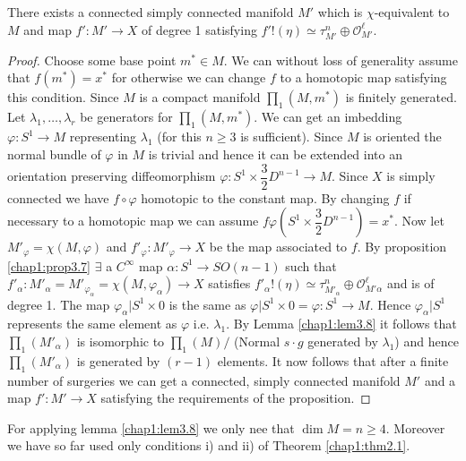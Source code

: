 \setcounter{prop}{8}
 \begin{prop}\label{chap1:prop3.9}%
There exists a connected simply connected manifold $M'$ which is
$\chi$-equivalent to $M$ and map $f':M'\rightarrow X$ of degree
1 satisfying $f'! (\eta) \simeq \tau^n_{M'}\oplus \mathscr{O}^\ell_{M'}$.  
 \end{prop} 
 
 \begin{proof}
Choose some base point $m^* \in M$. We can without loss of
generality assume that $f(m^*) = x^*$ for otherwise we can change $f$
to a homotopic map satisfying this condition. Since $M$ is a compact
manifold $\prod_1 (M, m^*)$ is finitely generated. Let $\lambda_1,
\ldots, \lambda_r$ be generators for $\prod_1 (M, m^*)$. We can get
an imbedding $\varphi: S^1 \rightarrow M$ representing $\lambda_1$
(for this $n\geq 3$ is sufficient). Since $M$ is oriented the normal
bundle of $\varphi$ in $M$ is trivial and hence it can be
extended\pageoriginale 
into an orientation preserving diffeomorphism $\varphi: S^1 \times
\dfrac{3}{2} D^{n-1}\rightarrow M$. Since $X$ is simply connected we
have $f \circ \varphi$ homotopic to the constant map. By changing $f$ if
necessary to a homotopic map we can assume $f \varphi (S^1 \times
\dfrac{3}{2} D^{n-1}) = x^*$. Now let $M'_\varphi = \chi (M, \varphi)$
and $f'_\varphi: M'_\varphi \rightarrow X$ be the map associated to
$f$. By proposition \ref{chap1:prop3.7} $\exists$ a $C^\infty$ map $\alpha: S^1
\rightarrow SO(n-1)$ such that $f'_\alpha: M'_\alpha = M'_{\varphi_\alpha} =
\chi (M, \varphi_\alpha ) \rightarrow X$ satisfies $f'_\alpha !
(\eta) \simeq \tau^n_{M'_\alpha} \oplus \mathscr{O}^\ell_{M'\alpha}$ and is
of degree 1. The map $\varphi_\alpha | S^1 \times 0$ is the same as
$\varphi | S^1 \times 0 = \varphi: S^1 \rightarrow
M$. Hence $\varphi_\alpha \big |S^1$ represents the same element as
$\varphi$ i.e. $\lambda_1$. By Lemma \ref{chap1:lem3.8} it follows that $\prod_1
(M'_\alpha )$ is isomorphic to $\prod_1 (M) /$ (Normal $s\cdot g$
generated by $\lambda_1$) and hence $\prod_1 (M'_\alpha)$ is
generated by $(r-1)$ elements. It now follows that after a finite
number of surgeries we can get a connected, simply connected manifold
$M'$ and a map $f': M' \rightarrow X$ satisfying the requirements of
the proposition.  
 \end{proof} 
  
\begin{remark*}%
For applying lemma \ref{chap1:lem3.8} we only nee that $\dim M = n
\geq 4$. Moreover we have so far used only conditions i) and ii) of
Theorem \ref{chap1:thm2.1}.   
 \end{remark*} 

